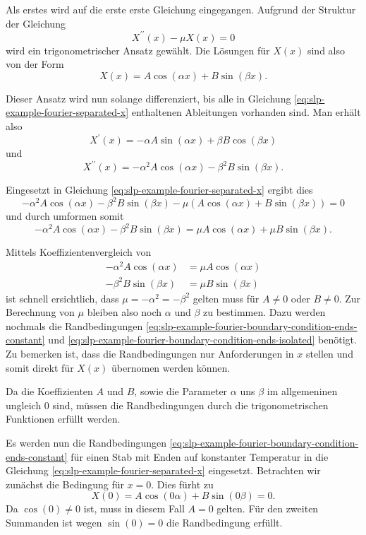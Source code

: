Als erstes wird auf die erste erste Gleichung eingegangen.
Aufgrund der Struktur der Gleichung
\[
    X^{\prime \prime}(x) - \mu X(x)
    =
    0
\]
wird ein trigonometrischer Ansatz gewählt.
Die Lösungen für $X(x)$ sind also von der Form
\[
    X(x)
    =
    A \cos \left( \alpha x\right) + B \sin \left( \beta x\right).
\]

Dieser Ansatz wird nun solange differenziert, bis alle in Gleichung 
\eqref{eq:slp-example-fourier-separated-x} enthaltenen Ableitungen vorhanden
sind.
Man erhält also
\[
    X^{\prime}(x)
    =
    - \alpha A \sin \left( \alpha x \right) +
    \beta B \cos \left( \beta x \right)
\]
und
\[
    X^{\prime \prime}(x)
    =
    -\alpha^{2} A \cos \left( \alpha x \right) -
    \beta^{2} B \sin \left( \beta x \right).
\]

Eingesetzt in Gleichung \eqref{eq:slp-example-fourier-separated-x} ergibt dies
\[
    -\alpha^{2}A\cos(\alpha x) - \beta^{2}B\sin(\beta x) -
    \mu\left(A\cos(\alpha x) + B\sin(\beta x)\right)
    =
    0
\]
und durch umformen somit
\[
    -\alpha^{2}A\cos(\alpha x) - \beta^{2}B\sin(\beta x)
    =
    \mu A\cos(\alpha x) + \mu B\sin(\beta x).
\]

Mittels Koeffizientenvergleich von
\[
\begin{aligned}
    -\alpha^{2}A\cos(\alpha x)
    &=
    \mu A\cos(\alpha x)
    \\
    -\beta^{2}B\sin(\beta x)
    &=
    \mu B\sin(\beta x)
\end{aligned}
\]
ist schnell ersichtlich, dass $ \mu = -\alpha^{2} = -\beta^{2} $ gelten muss für
$ A \neq 0 $ oder $ B \neq 0 $.
Zur Berechnung von $ \mu $ bleiben also noch  $ \alpha $ und $ \beta $ zu
bestimmen.
Dazu werden nochmals die Randbedingungen
\eqref{eq:slp-example-fourier-boundary-condition-ends-constant} und
\eqref{eq:slp-example-fourier-boundary-condition-ends-isolated} benötigt.
Zu bemerken ist, dass die Randbedingungen nur Anforderungen in $x$ stellen und
somit direkt für $X(x)$ übernomen werden können.

Da die Koeffizienten $A$ und $B$, sowie die Parameter $\alpha$ uns $\beta$ im
allgemeninen ungleich $0$ sind, müssen die Randbedingungen durch die
trigonometrischen Funktionen erfüllt werden.

Es werden nun die Randbedingungen
\eqref{eq:slp-example-fourier-boundary-condition-ends-constant} für einen Stab
mit Enden auf konstanter Temperatur in die Gleichung 
\eqref{eq:slp-example-fourier-separated-x} eingesetzt.
Betrachten wir zunächst die Bedingung für $x = 0$.
Dies fürht zu
\[
    X(0)
    =
    A \cos(0 \alpha) + B \sin(0 \beta)
    =
    0.
\]
Da $\cos(0) \neq 0$ ist, muss in diesem Fall $A = 0$ gelten.
Für den zweiten Summanden ist wegen $\sin(0) = 0$ die Randbedingung erfüllt.

